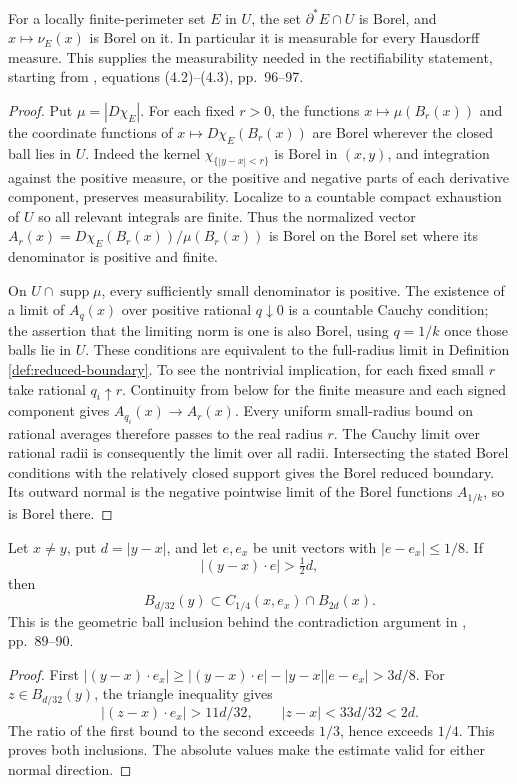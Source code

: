 \begin{lemma}\label{lem:reduced-boundary-borel}
For a locally finite-perimeter set $E$ in $U$, the set $\partial^*E\cap U$ is Borel, and $x\mapsto\nu_E(x)$ is Borel on it. In particular it is measurable for every Hausdorff measure. This supplies the measurability needed in the rectifiability statement, starting from \cite{Sim18}, equations (4.2)--(4.3), pp.~96--97.
\end{lemma}
\begin{proof}
Put $\mu=|D\chi_E|$. For each fixed $r>0$, the functions $x\mapsto\mu(B_r(x))$ and the coordinate functions of $x\mapsto D\chi_E(B_r(x))$ are Borel wherever the closed ball lies in $U$. Indeed the kernel $\chi_{\{|y-x|<r\}}$ is Borel in $(x,y)$, and integration against the positive measure, or the positive and negative parts of each derivative component, preserves measurability. Localize to a countable compact exhaustion of $U$ so all relevant integrals are finite. Thus the normalized vector $A_r(x)=D\chi_E(B_r(x))/\mu(B_r(x))$ is Borel on the Borel set where its denominator is positive and finite.

On $U\cap\operatorname{supp}\mu$, every sufficiently small denominator is positive. The existence of a limit of $A_q(x)$ over positive rational $q\downarrow0$ is a countable Cauchy condition; the assertion that the limiting norm is one is also Borel, using $q=1/k$ once those balls lie in $U$. These conditions are equivalent to the full-radius limit in Definition \ref{def:reduced-boundary}. To see the nontrivial implication, for each fixed small $r$ take rational $q_i\uparrow r$. Continuity from below for the finite measure and each signed component gives $A_{q_i}(x)\to A_r(x)$. Every uniform small-radius bound on rational averages therefore passes to the real radius $r$. The Cauchy limit over rational radii is consequently the limit over all radii. Intersecting the stated Borel conditions with the relatively closed support gives the Borel reduced boundary. Its outward normal is the negative pointwise limit of the Borel functions $A_{1/k}$, so is Borel there.
\end{proof}

\begin{lemma}\label{lem:normal-cone-ball-inclusion}
Let $x\ne y$, put $d=|y-x|$, and let $e,e_x$ be unit vectors with $|e-e_x|\leq1/8$. If
\[
 |(y-x)\cdot e|>\tfrac12d,
\]
then
\[
 B_{d/32}(y)\subset C_{1/4}(x,e_x)\cap B_{2d}(x).
\]
This is the geometric ball inclusion behind the contradiction argument in \cite{Sim18}, pp.~89--90.
\end{lemma}
\begin{proof}
First $|(y-x)\cdot e_x|\geq|(y-x)\cdot e|-|y-x||e-e_x|>3d/8$. For $z\in B_{d/32}(y)$, the triangle inequality gives
\[
 |(z-x)\cdot e_x|>11d/32,\qquad |z-x|<33d/32<2d.
\]
The ratio of the first bound to the second exceeds $1/3$, hence exceeds $1/4$. This proves both inclusions. The absolute values make the estimate valid for either normal direction.
\end{proof}

